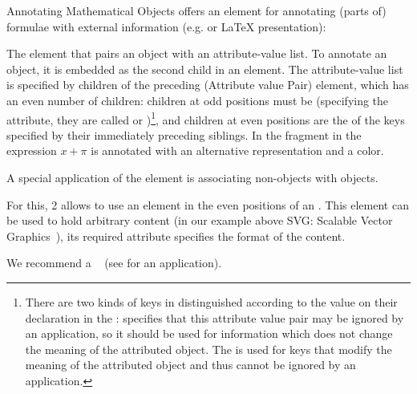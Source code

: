 \begin{omgroup}[id=annotating]{Annotating Mathematical Objects}
  \openmath offers an element for annotating (parts of) formulae with external information
  (e.g. {\mathml} or {\LaTeX} presentation):

\begin{definition}[id=omattr.def]
  The {} element that pairs an {\openmath} object with an
  attribute-value list. To annotate an {\openmath} object, it is embedded as the second
  child in an  element. The attribute-value list is specified
  by children of the preceding {} (Attribute value Pair) element,
  which has an even number of children: children at odd positions must be
   (specifying the attribute, they are called  or
  )\footnote{There are two kinds of keys in {\openmath} distinguished
    according to the  value on their  declaration
    in the :  specifies
    that this attribute value pair may be ignored by an application, so it should be used
    for information which does not change the meaning of the attributed {\openmath}
    object. The  is used for keys that modify the meaning of the
    attributed {\openmath} object and thus cannot be ignored by an application.}, and
  children at even positions are the  of the keys specified by their
  immediately preceding siblings. In the {\openmath} fragment in {} the
  expression $x+\pi$ is annotated with an alternative representation and a color.
\end{definition}

A special application of the  element is associating
non-\openmath objects with \openmath objects.

\begin{definition}[id=omforeign.def]
  For this, {\openmath}2 allows to use an  element in the even
  positions of an . This element can be used to hold arbitrary
  {\xml} content (in our example above SVG: Scalable Vector Graphics~\cite{W3C:svg02}),
  its required  attribute specifies the format
  of the content.
\end{definition}

We recommend a ~\cite{FreBor:MIME96} (see  for an
application).


\end{omgroup}
